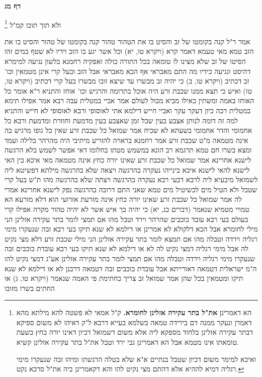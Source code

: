 \documentclass[12pt, openany]{book}
\newcommand{\sethebfont}{
\fontsize{10.5pt}{21.0pt} \selectfont
}
\newcommand{\twocol}[1]{
	{\sethebfont \begin{multicols}{2}
			#1
	\end{multicols}}	
}
\newcommand{\sectname}{}
\newcommand{\newsection}[1]{
	\addcontentsline{toc}{section}{#1}
	\renewcommand{\sectname}{#1}	
	\vspace{-\baselineskip}
	\begin{center}
		\textbf{%
\fontsize{16pt}{16pt}\selectfont
			#1}
	\end{center}
	\vspace{-\baselineskip}
	\nopagebreak
}
\newcommand{\footnotecomment}[1]{\footnote{#1}}
\newcommand{\commenta}[1]{\footnotecomment{#1}}
\begin{document}
\newsection{דף מג}
\twocol{ולא תוך תוכו קמ"ל 
\commenta{הא דאמרינן \textbf{את"ל בתר עקירה אזלינן לחומרא.}  ק"ל אמאי לא פשטה להא מילתא מהא דאמרן ונעקר ממנה דם בירידה טמאה בשלמא בעייא דרבא ל"ק דאיהו לא משום ספיקא דבתר עקירה אזלינן בלחוד מספקא ליה אלא משום דשמואל דכיון דאינו יורה כחץ בשעת טומאתו אינו מטמא אבל הא דאמרינן גבי ירד וטבל את"ל בתר עקירה אזלינן קשיא.\par  ואיכא למימר משום דכיון שטבל בנתיים א"א שלא בטלה הרגשתו ומיהו זבה שנעקרו מימי רגליה דמיא לההיא אלא דהתם מצי נקיט להו והא דקאמרינן ביה את"ל סרכא נקט. }

אמר ר"ל  קנה בקומטו של זב והסיט בו את הטהור טהור  קנה בקומטו של טהור והסיט בו את הזב טמא 
מאי טעמא דאמר קרא (ויקרא טו, יא) וכל אשר יגע בו הזב וידיו לא שטף במים זהו הסיטו של זב שלא מצינו לו טומאה בכל התורה כולה 
ואפקיה רחמנא בלשון נגיעה למימרא דהיסט ונגיעה כידיו מה התם מאבראי אף הכא מאבראי
אבל הזב ובעל קרי אינן מטמאין וכו' זב דכתיב (ויקרא טו, ב) כי יהיה זב מבשרו עד שיצא זובו מבשרו  בעל קרי דכתיב  (ויקרא טו, טז) ואיש כי תצא ממנו שכבת זרע
היה אוכל בתרומה והרגיש וכו' אוחז  והתניא ר"א אומר  כל האוחז באמה ומשתין כאילו מביא מבול לעולם 
אמר אביי  במטלית עבה  רבא אמר  אפילו תימא במטלית רכה כיון דעקר עקר  ואביי חייש דילמא אתי לאוסופי ורבא לאוסופי לא חייש 
והתניא  למה זה דומה לנותן אצבע בעין שכל זמן שאצבע בעין מדמעת וחוזרת ומדמעת 
ורבא כל אחמומי והדר אחמומי בשעתא לא שכיח 
אמר שמואל  כל שכבת זרע שאין כל גופו מרגיש בה אינה מטמאה  מ"ט  שכבת זרע אמר רחמנא בראויה להזריע 
מיתיבי  היה מהרהר בלילה ועמד ומצא בשרו חם טמא  תרגמא רב הונא  במשמש מטתו בחלומו דאי אפשר לשמש בלא הרגשה 
לישנא אחרינא אמר שמואל  כל שכבת זרע שאינו יורה כחץ אינה מטמאה  מאי איכא בין האי לישנא להאי לישנא  איכא בינייהו  נעקרה בהרגשה ויצאה שלא בהרגשה 
מילתא דפשיטא ליה לשמואל מיבעיא ליה לרבא  דבעי רבא  נעקרה בהרגשה ויצתה שלא בהרגשה מהו 
ת"ש  בעל קרי שטבל ולא הטיל מים לכשיטיל מים טמא  שאני התם דרובה בהרגשה נפק 
לישנא אחרינא אמרי לה אמר שמואל  כל שכבת זרע שאינו יורה כחץ אינה מזרעת אזרועי הוא דלא מזרעא הא טמויי מטמיא שנאמר (דברים כג, יא) כי יהיה בך איש אשר לא יהיה טהור מקרה אפילו קרי בעולם 
בעי רבא  עובד כוכבים שהרהר וירד וטבל מהו 
אם תמצי לומר בתר עקירה אזלינן הני מילי לחומרא אבל הכא דלקולא לא אמרינן או דילמא לא שנא  תיקו 
בעי רבא  זבה שנעקרו מימי רגליה וירדה וטבלה מהו 
אם תמצא לומר בתר עקירה אזלינן הני מילי שכבת זרע דלא מצי נקיט לה אבל מימי רגליה דמצי נקיט לה לא או דילמא לא שנא  תיקו 
בעי רבא  עובדת כוכבים זבה שנעקרו מימי רגליה
וירדה וטבלה מהו 
אם תמצי לומר בתר עקירה אזלינן אע"ג דמצי נקיט להו ה"מ ישראלית דטמאה דאורייתא אבל עובדת כוכבים זבה דטמאה דרבנן לא או דילמא לא שנא  תיקו
ומטמאין בכל שהן אמר שמואל  זב צריך כחתימת פי האמה שנאמר  (ויקרא טו, ג) או החתים בשרו מזובו 
}
\end{document}
